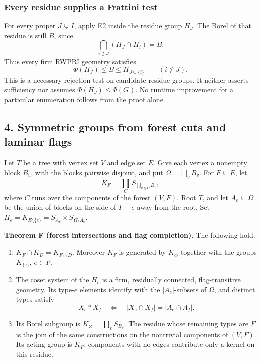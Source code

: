 \documentclass[
  10pt,
  letterpaper,
]{article}
\newcounter{none} %
\providecommand{\tightlist}{%
  \setlength{\itemsep}{0pt}\setlength{\parskip}{0pt}}
\begin{document}
\subsubsection{Every residue supplies a Frattini
test}\label{every-residue-supplies-a-frattini-test}

For every proper \(J\subsetneq I\), apply E2 inside the residue group
\(H_J\). The Borel of that residue is still \(B\), since \[
\bigcap_{i\notin J}(H_J\cap H_i)=B.
\] Thus every firm RWPRI geometry satisfies \[
\Phi(H_J)\leq B\leq H_{J\cup\{i\}}
\qquad(i\notin J).
\tag{A6.7}
\] This is a necessary rejection test on candidate residue groups. It
neither asserts sufficiency nor assumes \(\Phi(H_J)\leq\Phi(G)\). No
runtime improvement for a particular enumeration follows from the proof
alone.

\subsection{4. Symmetric groups from forest cuts and laminar
flags}\label{symmetric-groups-from-forest-cuts-and-laminar-flags}

Let \(T\) be a tree with vertex set \(V\) and edge set \(E\). Give each
vertex a nonempty block \(B_v\), with the blocks pairwise disjoint, and
put \(\Omega=\bigsqcup_vB_v\). For \(F\subseteq E\), let \[
K_F=\prod_C S_{\bigcup_{v\in C}B_v},
\tag{A2.1}
\] where \(C\) runs over the components of the forest \((V,F)\). Root
\(T\), and let \(A_e\subseteq\Omega\) be the union of blocks on the side
of \(T-e\) away from the root. Set
\(H_e=K_{E\setminus\{e\}}=S_{A_e}\times S_{\Omega\setminus A_e}\).

\textbf{Theorem F (forest intersections and flag completion).} The
following hold.

\begin{enumerate}
\def\labelenumi{\arabic{enumi}.}
\tightlist
\item
  \(K_F\cap K_D=K_{F\cap D}\). Moreover \(K_F\) is generated by
  \(K_\varnothing\) together with the groups \(K_{\{e\}}\), \(e\in F\).
\item
  The coset system of the \(H_e\) is a firm, residually connected,
  flag-transitive geometry. Its type-\(e\) elements identify with the
  \(|A_e|\)-subsets of \(\Omega\), and distinct types satisfy \[
  X_e\mathrel{*}X_f\quad\Longleftrightarrow\quad
  |X_e\cap X_f|=|A_e\cap A_f|.
  \tag{A2.2}
  \]
\item
  Its Borel subgroup is \(K_\varnothing=\prod_vS_{B_v}\). The residue
  whose remaining types are \(F\) is the join of the same constructions
  on the nontrivial components of \((V,F)\). Its acting group is
  \(K_F\); components with no edges contribute only a kernel on this
  residue.
\end{enumerate}
\end{document}
